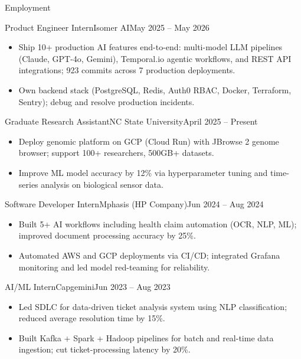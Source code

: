\documentclass[]{mcdowellcv}
\begin{document}
\makeheader

\begin{cvsection}{Employment}
  \begin{cvsubsection}{Product Engineer Intern}{Isomer AI}{May 2025 -- May 2026}
    \begin{itemize}
      \item Ship 10+ production AI features end-to-end: multi-model LLM pipelines (Claude, GPT-4o, Gemini), Temporal.io agentic workflows, and REST API integrations; 923 commits across 7 production deployments.
      \item Own backend stack (PostgreSQL, Redis, Auth0 RBAC, Docker, Terraform, Sentry); debug and resolve production incidents.
    \end{itemize}
    \vspace{-1.5pt}
  \end{cvsubsection}

  \begin{cvsubsection}{Graduate Research Assistant}{NC State University}{April 2025 -- Present}
    \begin{itemize}
      \item Deploy genomic platform on GCP (Cloud Run) with JBrowse 2 genome browser; support 100+ researchers, 500GB+ datasets.
      \item Improve ML model accuracy by 12\% via hyperparameter tuning and time-series analysis on biological sensor data.
    \end{itemize}
    \vspace{-1.5pt}
  \end{cvsubsection}

  \begin{cvsubsection}{Software Developer Intern}{Mphasis (HP Company)}{Jun 2024 -- Aug 2024}
    \begin{itemize}
      \item Built 5+ AI workflows including health claim automation (OCR, NLP, ML); improved document processing accuracy by 25\%.
      \item Automated AWS and GCP deployments via CI/CD; integrated Grafana monitoring and led model red-teaming for reliability.
    \end{itemize}
    \vspace{-1.5pt}
  \end{cvsubsection}

  \begin{cvsubsection}{AI/ML Intern}{Capgemini}{Jun 2023 -- Aug 2023}
    \begin{itemize}
      \item Led SDLC for data-driven ticket analysis system using NLP classification; reduced average resolution time by 15\%.
      \item Built Kafka + Spark + Hadoop pipelines for batch and real-time data ingestion; cut ticket-processing latency by 20\%.
    \end{itemize}
    \vspace{-1.5pt}
  \end{cvsubsection}
\end{cvsection}
\end{document}

